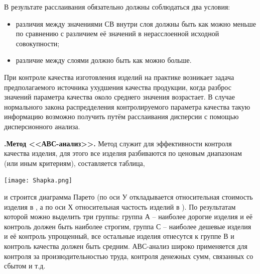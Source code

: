 \documentclass[unicode, 12pt, a4paper, oneside]{article}
\newcounter{qcnt}
\newcommand{\quest}[1]{\par\refstepcounter{qcnt}\textbf{\arabic{qcnt}.\quad #1}}
\begin{document}
В результате расслаивания обязательно должны соблюдаться два условия:
\begin{itemize}
\item 	различия между значениями СВ внутри слоя должны быть как можно меньше по сравнению с различием её значений в нерасслоенной исходной совокупности;
\item различие между слоями  должно быть как можно больше.
\end{itemize}	

При контроле качества изготовления изделий на практике возникает задача предполагаемого источника ухудшения качества продукции, когда разброс значений параметра качества около среднего значения возрастает. В случае нормального закона распредделения
 контролируемого параметра качества такую информацию возможно получить путём расслаивания дисперсии с помощью дисперсионного анализа.

\quest{Метод <<АВС-анализ>>.}
Метод служит для эффективности контроля качества изделия, для этого все изделия разбиваются по ценовым диапазонам (или иным критериям), составляется таблица,\\
\begin{center} 
  \texttt{[image: Shapka.png]}\\
  \end{center}
   и строится диаграмма Парето (по оси У откладывается относительная стоимость изделия в 
   \textdiscount
   , а по оси Х относительная частость изделий в
  \textdiscount). По результатам которой можно выделить три группы: группа А – наиболее дорогие изделия и её контроль должен быть наиболее строгим, группа С – наиболее дешевые изделия и её контроль упрощенный, все остальные изделия отнесутся к группе В и контроль качества должен быть средним.
  АВС-анализ широко применяется для контроля за производительностью труда, контроля денежных сумм, связанных со сбытом  и т.д.
  
\end{document}
